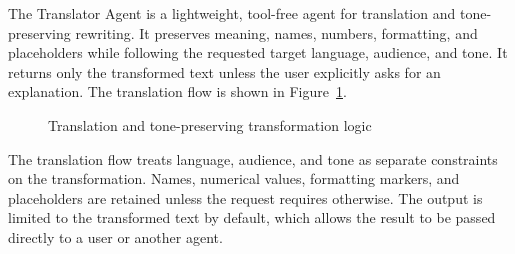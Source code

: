 The Translator Agent is a lightweight, tool-free agent for translation and
tone-preserving rewriting. It preserves meaning, names, numbers, formatting,
and placeholders while following the requested target language, audience, and
tone. It returns only the transformed text unless the user explicitly asks
for an explanation.
The translation flow is shown in Figure~\ref{fig:translator-logic}.
\begin{figure}[H]\centering
{}
\caption{Translation and tone-preserving transformation logic}
\label{fig:translator-logic}
\end{figure}
The translation flow treats language, audience, and tone as separate constraints on the transformation. Names, numerical values, formatting markers, and placeholders are retained unless the request requires otherwise. The output is limited to the transformed text by default, which allows the result to be passed directly to a user or another agent.

\clearpage
{}

